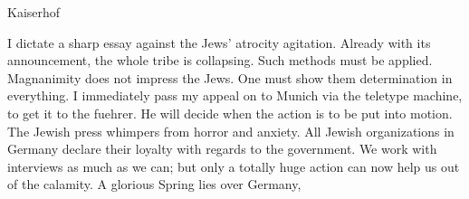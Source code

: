 Kaiserhof

I dictate a sharp essay against the Jews' atrocity agitation. Already with its announcement, the whole tribe is collapsing. Such methods must be applied. Magnanimity does not impress the Jews. One must show them determination in everything. I immediately pass my appeal on to Munich via the teletype machine, to get it to the fuehrer. He will decide when the action is to be put into motion. The Jewish press whimpers from horror and anxiety. All Jewish organizations in Germany declare their loyalty with regards to the government. We work with interviews as much as we can; but only a totally huge action can now help us out of the calamity. A glorious Spring lies over Germany,

